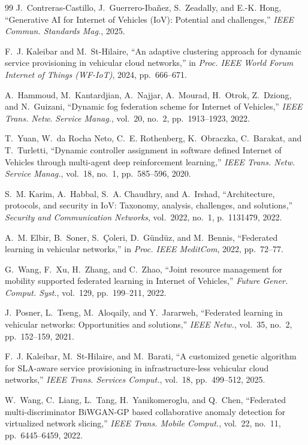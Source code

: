 \documentclass[journal]{IEEEtran}
\begin{document}
\begin{thebibliography}{99}
J.~Contreras-Castillo, J.~Guerrero-Iba\~{n}ez, S.~Zeadally, and E.-K. Hong,
``Generative AI for Internet of Vehicles (IoV): Potential and challenges,''
\emph{IEEE Commun. Standards Mag.}, 2025.

F.~J. Kaleibar and M.~St-Hilaire, ``An adaptive clustering approach for dynamic
service provisioning in vehicular cloud networks,'' in \emph{Proc. IEEE World
Forum Internet of Things (WF-IoT)}, 2024, pp.~666--671.

A.~Hammoud, M.~Kantardjian, A.~Najjar, A.~Mourad, H.~Otrok, Z.~Dziong, and
N.~Guizani, ``Dynamic fog federation scheme for Internet of Vehicles,''
\emph{IEEE Trans. Netw. Service Manag.}, vol.~20, no.~2, pp.~1913--1923, 2022.

T.~Yuan, W.~da Rocha Neto, C.~E. Rothenberg, K.~Obraczka, C.~Barakat, and
T.~Turletti, ``Dynamic controller assignment in software defined Internet of
Vehicles through multi-agent deep reinforcement learning,'' \emph{IEEE Trans.
Netw. Service Manag.}, vol.~18, no.~1, pp.~585--596, 2020.

S.~M. Karim, A.~Habbal, S.~A. Chaudhry, and A.~Irshad, ``Architecture,
protocols, and security in IoV: Taxonomy, analysis, challenges, and
solutions,'' \emph{Security and Communication Networks}, vol.~2022, no.~1,
p.~1131479, 2022.

A.~M. Elbir, B.~Soner, S.~\c{C}oleri, D.~G\"{u}nd\"{u}z, and M.~Bennis,
``Federated learning in vehicular networks,'' in \emph{Proc. IEEE
MeditCom}, 2022, pp.~72--77.

G.~Wang, F.~Xu, H.~Zhang, and C.~Zhao, ``Joint resource management for mobility
supported federated learning in Internet of Vehicles,'' \emph{Future Gener.
Comput. Syst.}, vol.~129, pp.~199--211, 2022.

J.~Posner, L.~Tseng, M.~Aloqaily, and Y.~Jararweh, ``Federated learning in
vehicular networks: Opportunities and solutions,'' \emph{IEEE Netw.}, vol.~35,
no.~2, pp.~152--159, 2021.

F.~J. Kaleibar, M.~St-Hilaire, and M.~Barati, ``A customized genetic algorithm
for SLA-aware service provisioning in infrastructure-less vehicular cloud
networks,'' \emph{IEEE Trans. Services Comput.}, vol.~18, pp.~499--512, 2025.

W.~Wang, C.~Liang, L.~Tang, H.~Yanikomeroglu, and Q.~Chen, ``Federated
multi-discriminator BiWGAN-GP based collaborative anomaly detection for
virtualized network slicing,'' \emph{IEEE Trans. Mobile Comput.}, vol.~22,
no.~11, pp.~6445--6459, 2022.


\end{thebibliography}
\end{document}

